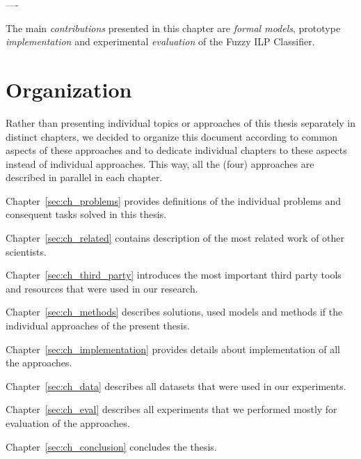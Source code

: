 ----

The main \emph{contributions} presented in this chapter are \emph{formal models}, prototype \emph{implementation} and experimental \emph{evaluation} of the Fuzzy ILP Classifier.



\section{Organization}

Rather than presenting individual topics or approaches of this thesis separately in distinct chapters, we decided to organize this document according to common aspects of these approaches and to dedicate individual chapters to these aspects instead of individual approaches. This way, all the (four) approaches are described in parallel in each chapter. 

Chapter~\ref{sec:ch_problems} provides definitions of the individual problems and consequent tasks solved in this thesis.

Chapter~\ref{sec:ch_related} contains description of the most related work of other scientists.

Chapter~\ref{sec:ch_third_party} introduces the most important third party tools and resources that were used in our research.

Chapter~\ref{sec:ch_methods} describes solutions, used models and methods if the individual approaches of the present thesis.

Chapter~\ref{sec:ch_implementation} provides details about implementation of all the approaches.

Chapter~\ref{sec:ch_data} describes all datasets that were used in our experiments.

Chapter~\ref{sec:ch_eval} describes all experiments that we performed mostly for evaluation of the approaches.

Chapter~\ref{sec:ch_conclusion} concludes the thesis.

